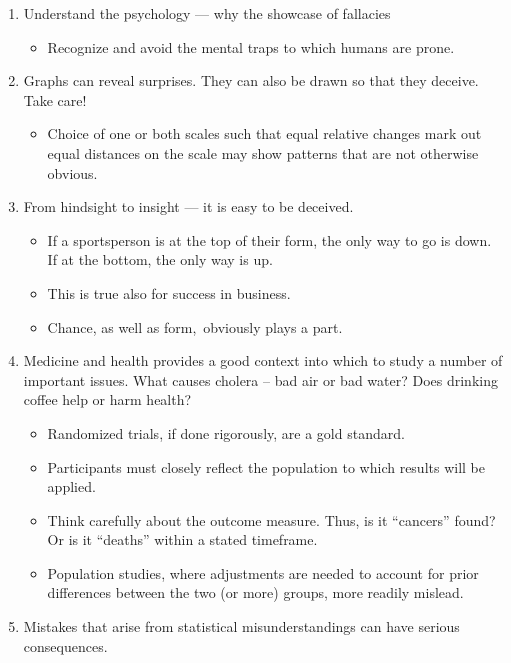 \documentclass[
  10pt,
  b5paper]{book}
\providecommand{\tightlist}{%
  \setlength{\itemsep}{0pt}\setlength{\parskip}{0pt}}
\begin{document}
\begin{enumerate}
\def\labelenumi{\arabic{enumi}.}
\tightlist
\item
  Understand the psychology --- why the showcase of fallacies

  \begin{itemize}
  \tightlist
  \item
    Recognize and avoid the mental traps to which humans are prone.
  \end{itemize}
\item
  Graphs can reveal surprises. They can also be drawn
  so that they deceive. Take care!

  \begin{itemize}
  \tightlist
  \item
    Choice of one or both scales such that equal relative
    changes mark out equal distances on the scale may show
    patterns that are not otherwise obvious.
  \end{itemize}
\item
  From hindsight to insight --- it is easy to be deceived.

  \begin{itemize}
  \tightlist
  \item
    If a sportsperson is at the top of their form, the only
    way to go is down. If at the bottom, the only way is up.
  \item
    This is true also for success in business.
  \item
    Chance, as well as form,~obviously plays a part.
  \end{itemize}
\item
  Medicine and health provides a good context into which to study
  a number of important issues. What causes cholera -- bad air or bad water?
  Does drinking coffee help or harm health?

  \begin{itemize}
  \tightlist
  \item
    Randomized trials, if done rigorously, are a gold standard.
  \item
    Participants must closely reflect the population to which
    results will be applied.
  \item
    Think carefully about the outcome measure. Thus, is it
    ``cancers'' found? Or is it ``deaths'' within a stated timeframe.
  \item
    Population studies, where adjustments are needed
    to account for prior differences between the two (or more)
    groups, more readily mislead.
  \end{itemize}
\item
  Mistakes that arise from statistical misunderstandings
  can have serious consequences.


\end{enumerate}
\end{document}
